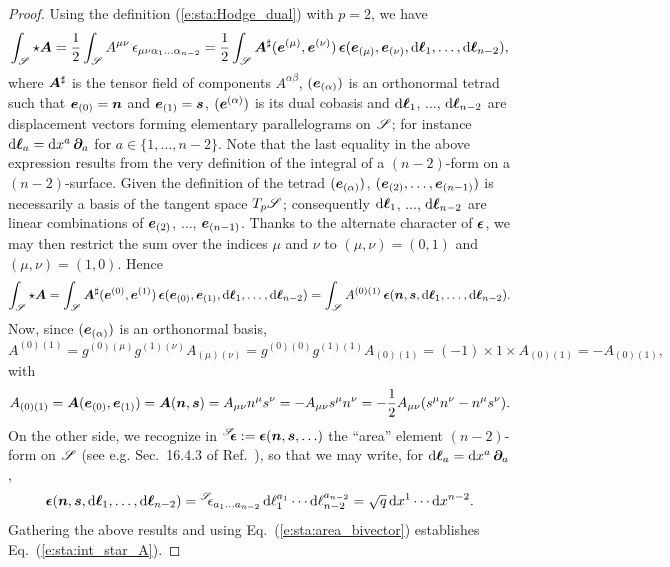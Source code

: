 \begin{proof}
Using the definition (\ref{e:sta:Hodge_dual}) with $p=2$, we have
\[
    \int_{\mathscr{S}} \star \bm{A} =
        \frac{1}{2} \int_{\mathscr{S}} A^{\mu\nu} \,
        \epsilon_{\mu\nu\alpha_1\ldots\alpha_{n-2}} =
         \frac{1}{2} \int_{\mathscr{S}} \bm{A}^\sharp (\bm{e}^{(\mu)}, \bm{e}^{(\nu)})
                \, \bm{\epsilon}(\bm{e}_{(\mu)}, \bm{e}_{(\nu)}, \mathrm{d}\bm{\ell}_{1},
                    \ldots, \mathrm{d}\bm{\ell}_{n-2}) ,
\]
where $\bm{A}^\sharp$ is the tensor field of components $A^{\alpha\beta}$,
$(\bm{e}_{(\alpha)})$ is an orthonormal tetrad such that
$\bm{e}_{(0)} = \bm{n}$ and $\bm{e}_{(1)} = \bm{s}$,
$(\bm{e}^{(\alpha)})$ is its dual cobasis and $\mathrm{d}\bm{\ell}_{1}$, $\ldots$, $\mathrm{d}\bm{\ell}_{n-2}$
are displacement vectors forming elementary parallelograms on $\mathscr{S}$; for instance
$\mathrm{d}\bm{\ell}_{a} = \mathrm{d} x^a \, \bm{\partial}_a$ for $a\in\{1, \ldots, n-2\}$.
Note that the last equality in the above expression results from the very
definition of the integral of a $(n-2)$-form on a $(n-2)$-surface.
Given the definition of the tetrad $(\bm{e}_{(\alpha)})$, $(\bm{e}_{(2)}, \ldots, \bm{e}_{(n-1)})$
is necessarily a basis of the tangent space $T_p\mathscr{S}$; consequently
$\mathrm{d}\bm{\ell}_{1}$, $\ldots$, $\mathrm{d}\bm{\ell}_{n-2}$ are linear combinations of $\bm{e}_{(2)}$,
$\ldots$, $\bm{e}_{(n-1)}$. Thanks to the alternate character of $\bm{\epsilon}$,
we may then restrict the sum over the indices $\mu$ and $\nu$ to
$(\mu,\nu) = (0,1)$ and $(\mu,\nu) = (1,0)$.
Hence
\[
     \int_{\mathscr{S}} \star \bm{A}
     = \int_{\mathscr{S}}
    \bm{A}^\sharp (\bm{e}^{(0)}, \bm{e}^{(1)})
            \, \bm{\epsilon}(\bm{e}_{(0)}, \bm{e}_{(1)}, \mathrm{d}\bm{\ell}_{1}, \ldots , \mathrm{d}\bm{\ell}_{n-2})
    =  \int_{\mathscr{S}} A^{(0)(1)}
    \, \bm{\epsilon}(\bm{n}, \bm{s}, \mathrm{d}\bm{\ell}_{1}, \ldots , \mathrm{d}\bm{\ell}_{n-2}) .
\]
Now, since $(\bm{e}_{(\alpha)})$ is an orthonormal basis,
\[
  A^{(0)(1)} = g^{(0)(\mu)} g^{(1)(\nu)} A_{(\mu)(\nu)} = g^{(0)(0)} g^{(1)(1)}
    A_{(0)(1)} = (-1)\times 1 \times A_{(0)(1)} = - A_{(0)(1)} ,
\]
with
\[
    A_{(0)(1)} = \bm{A}(\bm{e}_{(0)}, \bm{e}_{(1)}) = \bm{A}(\bm{n}, \bm{s})
        = A_{\mu\nu} n^\mu s^\nu = - A_{\mu\nu} s^\mu n^\nu
        = - \frac{1}{2} A_{\mu\nu} (s^\mu n^\nu - n^\mu s^\nu) .
\]
On the other side, we recognize in ${}^{\mathscr{S}}\!\!\bm{\epsilon} := \bm{\epsilon}(\bm{n}, \bm{s}, \ldots)$ the
``area'' element $(n-2)$-form on $\mathscr{S}$ (see e.g. Sec.~16.4.3 of Ref.~\cite{Gourg13}),
so that we may write, for
$\mathrm{d}\bm{\ell}_{a} = \mathrm{d} x^a \, \bm{\partial}_a$,
\[
    \bm{\epsilon}(\bm{n}, \bm{s}, \mathrm{d}\bm{\ell}_{1}, \ldots , \mathrm{d}\bm{\ell}_{n-2}) =
        {}^{\mathscr{S}}\!\!\epsilon_{a_1\ldots a_{n-2}} \, \mathrm{d}\ell_{1}^{a_1}\cdots  \mathrm{d}\ell_{n-2}^{a_{n-2}}
        = \sqrt{q} \, \mathrm{d} x^1 \cdots  \mathrm{d} x^{n-2} .
\]
Gathering the above results and using Eq.~(\ref{e:sta:area_bivector})
establishes Eq.~(\ref{e:sta:int_star_A}).
\end{proof}

